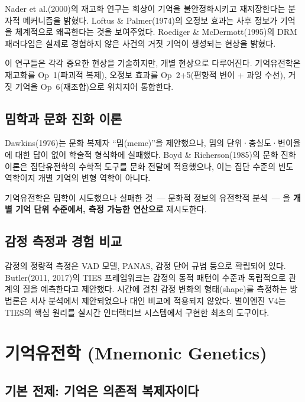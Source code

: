 \documentclass[11pt, a4paper]{article}
\begin{document}
Nader et al.(2000)의 재고화 연구는 회상이 기억을 불안정화시키고 재저장한다는 분자적 메커니즘을 밝혔다\cite{nader2000}. Loftus \& Palmer(1974)의 오정보 효과는 사후 정보가 기억을 체계적으로 왜곡한다는 것을 보여주었다\cite{loftus1974}. Roediger \& McDermott(1995)의 DRM 패러다임은 실제로 경험하지 않은 사건의 거짓 기억이 생성되는 현상을 밝혔다\cite{roediger1995}.

이 연구들은 각각 중요한 현상을 기술하지만, 개별 현상으로 다루어진다. 기억유전학은 재고화를 Op~1(파괴적 복제), 오정보 효과를 Op~2+5(편향적 변이 + 과잉 수선), 거짓 기억을 Op~6(재조합)으로 위치지어 통합한다.

\subsection{밈학과 문화 진화 이론}

Dawkins(1976)는 문화 복제자 ``밈(meme)''을 제안했으나\cite{dawkins1976}, 밈의 단위·충실도·변이율에 대한 답이 없어 학술적 형식화에 실패했다\cite{aunger2002}. Boyd \& Richerson(1985)의 문화 진화 이론은 집단유전학의 수학적 도구를 문화 전달에 적용했으나\cite{boyd1985}, 이는 집단 수준의 빈도 역학이지 개별 기억의 변형 역학이 아니다.

기억유전학은 밈학이 시도했으나 실패한 것~--- 문화적 정보의 유전학적 분석~--- 을 \textbf{개별 기억 단위 수준에서, 측정 가능한 연산으로} 재시도한다.

\subsection{감정 측정과 경험 비교}

감정의 정량적 측정은 VAD 모델\cite{russell1977}, PANAS\cite{watson1988}, 감정 단어 규범\cite{warriner2013} 등으로 확립되어 있다. Butler(2011, 2017)의 TIES 프레임워크\cite{butler2011,butler2017}는 감정의 동적 패턴이 수준과 독립적으로 관계의 질을 예측한다고 제안했다. 시간에 걸친 감정 변화의 형태(shape)를 측정하는 방법론은 서사 분석\cite{reagan2016}에서 제안되었으나 대인 비교에 적용되지 않았다. 별이엔진 V4는 TIES의 핵심 원리를 실시간 인터랙티브 시스템에서 구현한 최초의 도구이다.


\section{기억유전학 (Mnemonic Genetics)}

\subsection{기본 전제: 기억은 의존적 복제자이다}
\end{document}
